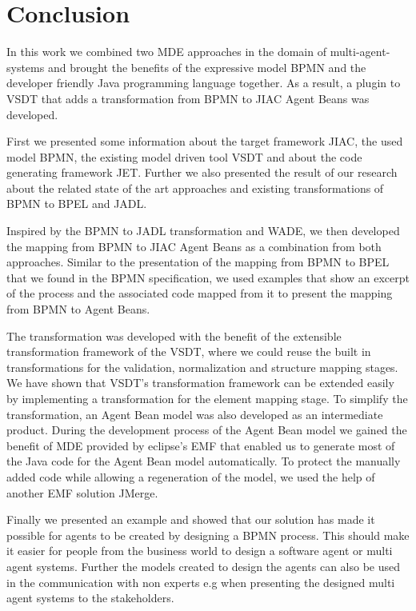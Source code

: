 \chapter{Conclusion}
\label{chap:conclusion}
In this work we combined two MDE approaches in the domain of multi-agent-systems and brought the benefits of the expressive model BPMN and the developer friendly Java programming language together. As a result, a plugin to VSDT that adds a transformation from BPMN to JIAC Agent Beans was developed. 

First we presented some information about the target framework JIAC, the used model BPMN, the existing model driven tool VSDT and about the code generating framework JET.  Further we also presented the result of our research about the related state of the art approaches and existing transformations of BPMN to BPEL and JADL. 

Inspired by the BPMN to JADL transformation and WADE, we then developed the mapping from BPMN to JIAC Agent Beans as a combination from both approaches. Similar to the presentation of the mapping from BPMN to BPEL that we found in the BPMN specification, we used examples that show an excerpt of the process and the associated code mapped from it to present the mapping from BPMN to Agent Beans. 

The transformation was developed with the benefit of the extensible transformation framework of the VSDT, where we could reuse the built in transformations for the validation, normalization and structure mapping stages. We have shown that VSDT's transformation framework can be extended easily by implementing a transformation for the element mapping stage. To simplify the transformation, an Agent Bean model was also developed as an intermediate product. During the development process of the Agent Bean model we gained the benefit of MDE provided by eclipse's EMF that enabled us to generate most of the Java code for the Agent Bean model automatically.
To protect the manually added code while allowing a regeneration of the model, we used the help of another EMF solution JMerge.
 
Finally we presented an example and showed that our solution has made it possible for agents to be created by designing a BPMN process. This should make it easier for people from the business world to design a software agent or multi agent systems. Further the models created to design the agents can also be used in the communication with non experts e.g when presenting the designed multi agent systems to the stakeholders.
